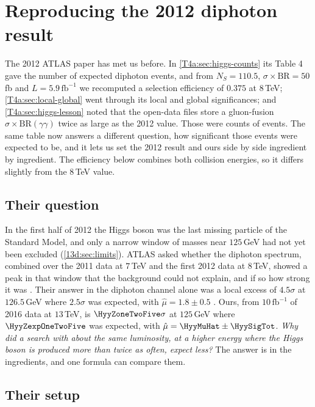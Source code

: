 \section{Reproducing the 2012 diphoton result}
\label{13d:sec:repro}

The 2012 ATLAS paper has met us before. In \cref{T4a:sec:higgs-counts} its Table 4 gave
the number of expected diphoton events, and from $N_S=110.5$, $\sigma\times\mathrm{BR}=50\,$fb
and $L=5.9\,\mathrm{fb}^{-1}$ we recomputed a selection efficiency of $0.375$ at $8\,$TeV;
\cref{T4a:sec:local-global} went through its local and global significances; and
\cref{T4a:sec:higgs-lesson} noted that the open-data files store a gluon-fusion
$\sigma\times\mathrm{BR}(\gamma\gamma)$ twice as large as the 2012 value. Those were counts of
events. The same table now answers a different question, how significant those events
were expected to be, and it lets us set the 2012 result and ours side by side ingredient by
ingredient. The efficiency below combines both collision energies, so it differs slightly
from the $8\,$TeV value.

\subsection{Their question}
\label{13d:sec:repro-question}

In the first half of 2012 the Higgs boson was the last missing particle of the Standard
Model, and only a narrow window of masses near $125\,$GeV had not yet been excluded
(\cref{13d:sec:limits}). ATLAS asked whether the diphoton spectrum, combined over the
2011 data at $7\,$TeV and the first 2012 data at $8\,$TeV, showed a peak in that window
that the background could not explain, and if so how strong it was
\cite{AadHiggs2012}. Their answer in the diphoton channel alone was a local excess of
$4.5\sigma$ at $126.5\,$GeV where $2.5\sigma$ was expected, with
$\hat\mu=1.8\pm0.5$ . Ours, from $10\,\mathrm{fb}^{-1}$ of
2016 data at $13\,$TeV, is $\HyyZoneTwoFive\sigma$ at $125\,$GeV where $\HyyZexpOneTwoFive$
was expected, with $\hat\mu=\HyyMuHat\pm\HyySigTot$. \emph{Why did a search with about the
same luminosity, at a higher energy where the Higgs boson is produced more than twice as
often, expect less?} The answer is in the ingredients, and one formula can compare them.

\subsection{Their setup}
\label{13d:sec:repro-setup}

